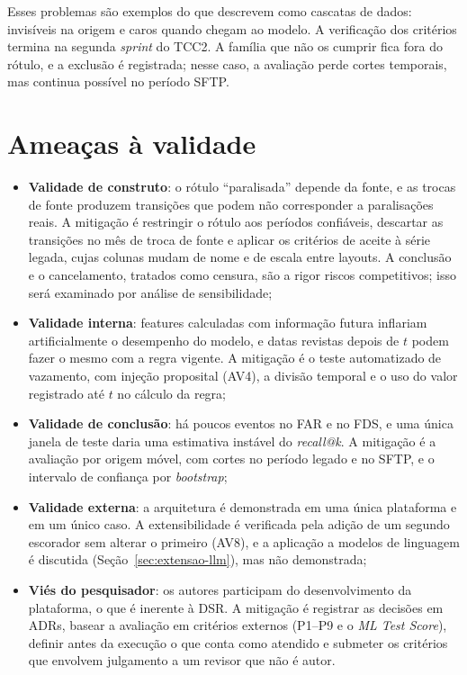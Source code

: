 Esses problemas são exemplos do que  descrevem como cascatas de dados: invisíveis na origem e caros quando chegam ao modelo. A verificação dos critérios termina na segunda \textit{sprint} do TCC2. A família que não os cumprir fica fora do rótulo, e a exclusão é registrada; nesse caso, a avaliação perde cortes temporais, mas continua possível no período SFTP.

\section{Ameaças à validade}

\begin{itemize}
	\item \textbf{Validade de construto}: o rótulo ``paralisada'' depende da fonte, e as trocas de fonte produzem transições que podem não corresponder a paralisações reais. A mitigação é restringir o rótulo aos períodos confiáveis, descartar as transições no mês de troca de fonte e aplicar os critérios de aceite à série legada, cujas colunas mudam de nome e de escala entre layouts. A conclusão e o cancelamento, tratados como censura, são a rigor riscos competitivos; isso será examinado por análise de sensibilidade;
	\item \textbf{Validade interna}: features calculadas com informação futura inflariam artificialmente o desempenho do modelo, e datas revistas depois de $t$ podem fazer o mesmo com a regra vigente. A mitigação é o teste automatizado de vazamento, com injeção proposital (AV4), a divisão temporal e o uso do valor registrado até $t$ no cálculo da regra;
	\item \textbf{Validade de conclusão}: há poucos eventos no FAR e no FDS, e uma única janela de teste daria uma estimativa instável do \textit{recall@k}. A mitigação é a avaliação por origem móvel, com cortes no período legado e no SFTP, e o intervalo de confiança por \textit{bootstrap};
	\item \textbf{Validade externa}: a arquitetura é demonstrada em uma única plataforma e em um único caso. A extensibilidade é verificada pela adição de um segundo escorador sem alterar o primeiro (AV8), e a aplicação a modelos de linguagem é discutida (Seção~\ref{sec:extensao-llm}), mas não demonstrada;
	\item \textbf{Viés do pesquisador}: os autores participam do desenvolvimento da plataforma, o que é inerente à DSR. A mitigação é registrar as decisões em ADRs, basear a avaliação em critérios externos (P1--P9 e o \textit{ML Test Score}), definir antes da execução o que conta como atendido e submeter os critérios que envolvem julgamento a um revisor que não é autor.
\end{itemize}
